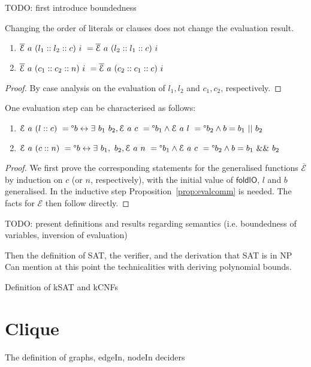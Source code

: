 \documentclass[a4paper,UKenglish,cleveref, autoref]{lipics-v2019}
\begin{document}
TODO: first introduce boundedness

\begin{proposition}\label{prop:evalcomm}
  Changing the order of literals or clauses does not change the evaluation result. 
  \begin{enumerate}
    \item $\overline{\mathcal{E}}~a~(l_1 :: l_2 :: c)~i~ = \overline{\mathcal{E}}~a~(l_2 :: l_1 :: c)~i~$ 
    \item $\overline{\mathcal{E}}~a~(c_1 :: c_2 :: n)~i~ = \overline{\mathcal{E}}~a~(c_2 :: c_1 :: c)~i~$
  \end{enumerate}
\end{proposition}
\begin{proof}
  By case analysis on the evaluation of $l_1, l_2$ and $c_1, c_2$, respectively.
\end{proof}

\begin{lemma}\label{prop:evalstepinv}
  One evaluation step can be characterised as follows:
  \begin{enumerate}
    \item $\mathcal{E}~a~(l::c)~ = \degree b \leftrightarrow \exists~b_1~b_2, \mathcal{E}~a~c~ = \degree b_1 \land \mathcal{E}~a~l~ = \degree b_2 \land b = b_1~||~b_2$
    \item $\mathcal{E}~a~(c::n)~ = \degree b \leftrightarrow \exists~b_1,~b_2, \mathcal{E}~a~n~ = \degree b_1 \land \mathcal{E}~a~c~ = \degree b_2 \land b = b_1~\&\&~b_2$
  \end{enumerate}
\end{lemma}
\begin{proof}
  We first prove the corresponding statements for the generalised functions $\overline{\mathcal{E}}$ by induction on $c$ (or $n$, respectively), with the initial value of $\textsf{foldlO}$, $l$ and $b$ generalised. In the inductive step Proposition~\ref{prop:evalcomm} is needed.
  The facts for $\mathcal{E}$ then follow directly.
\end{proof}



TODO: present definitions and results regarding semantics (i.e. boundedness of variables, inversion of evaluation)

Then the definition of SAT, the verifier, and the derivation that SAT is in NP
Can mention at this point the technicalities with deriving polynomial bounds. 

Definition of kSAT and kCNFs

\section{Clique}
The definition of graphs, edgeIn, nodeIn deciders
\end{document}
